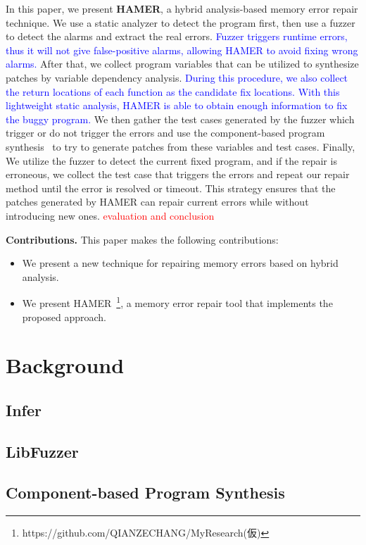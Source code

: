 \documentclass[a4j,dvipdfmx]{article}
\begin{document}
In this paper, we present \textbf{HAMER}, a hybrid analysis-based memory error repair \mbox{technique}. We use a static analyzer to detect the program first, then use a fuzzer to detect the alarms and extract the real errors. \textcolor{blue}{Fuzzer triggers runtime errors, thus it will not give false-positive alarms, allowing HAMER to avoid fixing wrong alarms.} After that, we collect program variables that can be utilized to synthesize patches by variable dependency analysis. \textcolor{blue}{During this procedure, we also collect the return locations of each function as the candidate fix locations. With this lightweight static analysis, HAMER is able to obtain enough information to fix the buggy program.} We then gather the test cases generated by the fuzzer which trigger or do not trigger the errors and use the component-based program synthesis~\cite{oracle} to try to generate patches from these variables and test cases. Finally, We utilize the fuzzer to detect the current fixed program, and if the repair is erroneous, we collect the test case that triggers the errors and repeat our repair method until the error is resolved or timeout. This strategy ensures that the patches generated by HAMER can repair current errors while without introducing new ones. \textcolor{red}{evaluation and conclusion}

\textbf{Contributions.} This paper makes the following contributions:
\begin{itemize}
  \item We present a new technique for repairing memory errors based on hybrid analysis.
  \item We present HAMER~\footnote{https://github.com/QIANZECHANG/MyResearch(仮)}, a memory error repair tool that implements the proposed approach.
\end{itemize}

\section{Background}
\subsection{Infer}
\subsection{LibFuzzer}
\subsection{Component-based Program Synthesis}
\end{document}
